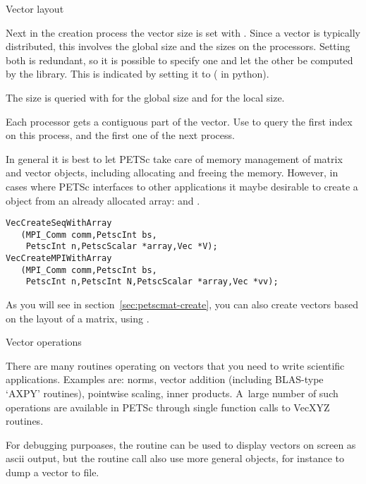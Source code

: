  {Vector layout}

Next in the creation process the vector size is set with .
Since a
vector is typically distributed, this involves the global size and the
sizes on the processors. Setting both is redundant, so it is possible
to specify one and let the other be computed by the library. This is
indicated by setting it to 
( in python).

The size is queried with  for the global size
and  for the local size.

Each processor gets a contiguous part of the vector. Use
 to query the first index on this
process, and the first one of the next process.

In general it is best to let PETSc take care of memory management of
matrix and vector objects, including allocating and freeing the memory.
However, in cases where PETSc interfaces to other applications it maybe desirable
to create a  object from an already
allocated array:  and
.
\begin{lstlisting}
VecCreateSeqWithArray
   (MPI_Comm comm,PetscInt bs,
    PetscInt n,PetscScalar *array,Vec *V);
VecCreateMPIWithArray
   (MPI_Comm comm,PetscInt bs,
    PetscInt n,PetscInt N,PetscScalar *array,Vec *vv);  
\end{lstlisting}

As you will see in section~\ref{sec:petscmat-create},
you can also create vectors based on the layout of a matrix,
using .

 {Vector operations}

There are many routines operating on vectors that you need
to write scientific applications. Examples are: norms, vector addition
(including \ac{BLAS}-type `AXPY' routines), pointwise scaling, inner products.
A~large number of such operations are available in PETSc through
single function calls to {VecXYZ} routines.

For debugging purpoases,
the  routine can be used to display vectors on screen as
ascii output,
%
%
but the routine call also use more general  objects, for
instance to dump a vector to file.

